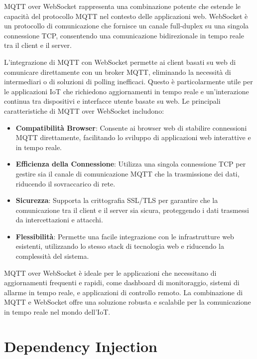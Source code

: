 \documentclass[12pt,a4paper,openright,twoside]{book}
\begin{document}
MQTT over WebSocket rappresenta una combinazione potente che estende le capacità del protocollo \ac{MQTT} nel contesto delle applicazioni web. WebSocket è un protocollo 
di comunicazione che fornisce un canale full-duplex su una singola connessione TCP, consentendo una comunicazione bidirezionale in tempo reale tra il client e il server.

L'integrazione di \ac{MQTT} con WebSocket permette ai client basati su web di comunicare direttamente con un broker \ac{MQTT}, eliminando la necessità di intermediari o di 
soluzioni di polling inefficaci. Questo è particolarmente utile per le applicazioni \ac{IoT} che richiedono aggiornamenti in tempo reale e un'interazione continua tra 
dispositivi e interfacce utente basate su web. Le principali caratteristiche di MQTT over WebSocket includono:

\begin{itemize}
    \item \textbf{Compatibilità Browser}: 
    Consente ai browser web di stabilire connessioni \ac{MQTT} direttamente, facilitando lo sviluppo di applicazioni web interattive e in tempo reale.
    \item \textbf{Efficienza della Connessione}: 
    Utilizza una singola connessione TCP per gestire sia il canale di comunicazione \ac{MQTT} che la trasmissione dei dati, riducendo il sovraccarico di rete.
    \item \textbf{Sicurezza}: 
    Supporta la crittografia SSL/TLS per garantire che la comunicazione tra il client e il server sia sicura, proteggendo i dati trasmessi da intercettazioni e attacchi.
    \item \textbf{Flessibilità}: 
    Permette una facile integrazione con le infrastrutture web esistenti, utilizzando lo stesso stack di tecnologia web e riducendo la complessità del sistema.
\end{itemize}

MQTT over WebSocket è ideale per le applicazioni che necessitano di aggiornamenti frequenti e rapidi, come dashboard di monitoraggio, sistemi di allarme in tempo reale, 
e applicazioni di controllo remoto. La combinazione di \ac{MQTT} e WebSocket offre una soluzione robusta e scalabile per la comunicazione in tempo reale nel mondo dell'\ac{IoT}.

\section{Dependency Injection}
\end{document}
